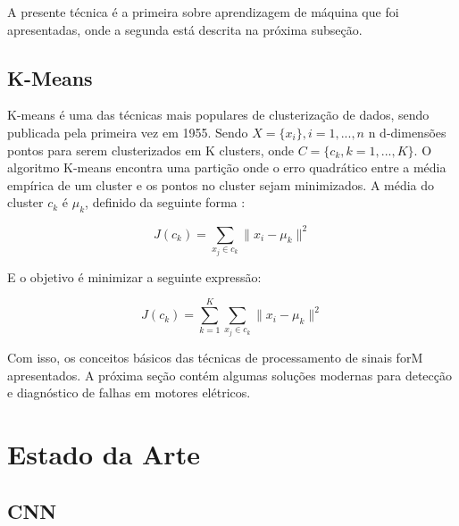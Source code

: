 A presente técnica é a primeira sobre aprendizagem de máquina que foi apresentadas, onde a segunda está descrita na próxima subseção.


% 

\subsection{K-Means}

K-means é uma das técnicas mais populares de clusterização de dados, sendo publicada pela primeira vez em 1955. Sendo $X=\{x_i\}, i=1, ..., n$
n d-dimensões pontos para serem clusterizados em K clusters, onde $C = \{c_k, k=1, ..., K\}$. O algoritmo K-means encontra uma partição onde o erro quadrático entre a média 
empírica de um cluster e os pontos no cluster sejam minimizados. A média do cluster $c_k$ é $\mu_k$, definido da seguinte forma \cite{Jain2010}:

\begin{equation}\label{eq:k-means}
    J(c_k) = \sum_{x_j\in c_k} {\parallel x_i-\mu_k \parallel^2}
\end{equation}

E o objetivo é minimizar a seguinte expressão:

\begin{equation}\label{eq:k-means}
    J(c_k) = \sum_{k=1}^{K}\sum_{x_j\in c_k} {\parallel x_i-\mu_k \parallel^2}
\end{equation}

Com isso, os conceitos básicos das técnicas de processamento de sinais forM apresentados. A próxima seção contém algumas soluções
modernas para detecção e diagnóstico de falhas em motores elétricos.


% 

\section{Estado da Arte}


% 

\subsection{CNN}

